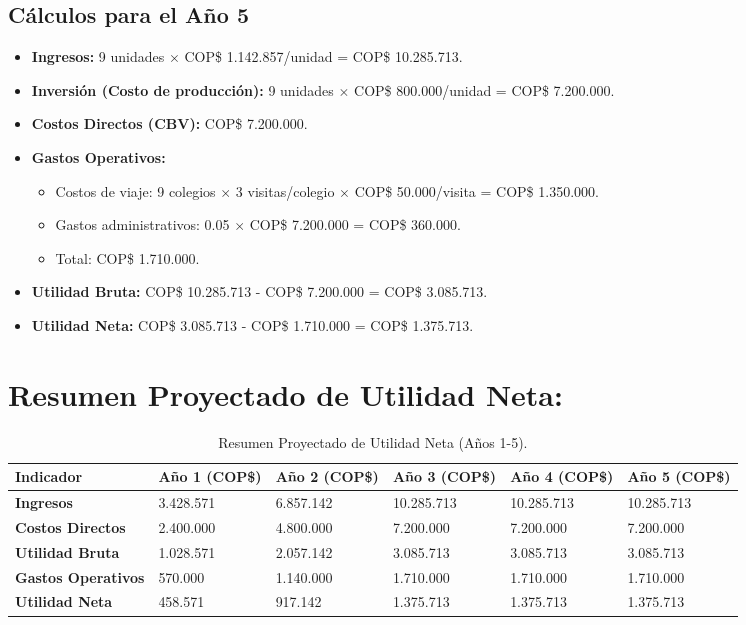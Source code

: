 \subsection*{Cálculos para el Año 5}
\begin{itemize}
    \item \textbf{Ingresos:} 
			9 unidades $\times$ COP\$ 1.142.857/unidad = COP\$ 10.285.713.
    \item \textbf{Inversión (Costo de producción):} 
			9 unidades $\times$ COP\$ 800.000/unidad = COP\$ 7.200.000.
    \item \textbf{Costos Directos (CBV):} COP\$ 7.200.000.
    \item \textbf{Gastos Operativos:}
    \begin{itemize}
        \item Costos de viaje: 
					9 colegios $\times$ 3 visitas/colegio $\times$ COP\$ 50.000/visita = 
					COP\$ 1.350.000.
        \item Gastos administrativos: 0.05 $\times$ COP\$ 7.200.000 = 
					COP\$ 360.000.
        \item Total: COP\$ 1.710.000.
    \end{itemize}
    \item \textbf{Utilidad Bruta:} COP\$ 10.285.713 - COP\$ 7.200.000 = COP\$ 3.085.713.
    \item \textbf{Utilidad Neta:} COP\$ 3.085.713 - COP\$ 1.710.000 = COP\$ 1.375.713.
\end{itemize}

\newpage

\section*{Resumen Proyectado de Utilidad Neta:}

\begin{table}[h!]
    \centering
    \small 
    \begin{tabularx}{\textwidth}{lXXXXX} 
        \toprule
        \textbf{Indicador} & \textbf{Año 1 (COP\$)} & \textbf{Año 2 (COP\$)} & \textbf{Año 3 (COP\$)} & \textbf{Año 4 (COP\$)} & \textbf{Año 5 (COP\$)} \\
        \midrule
        \textbf{Ingresos} &  3.428.571 & 6.857.142 & 10.285.713 & 10.285.713 & 10.285.713 \\
        \textbf{Costos Directos} & 2.400.000 & 4.800.000 & 7.200.000 & 7.200.000 & 7.200.000 \\
        \textbf{Utilidad Bruta} & 1.028.571 & 2.057.142 & 3.085.713 & 3.085.713 & 3.085.713 \\
        \textbf{Gastos Operativos} & 570.000 & 1.140.000 & 1.710.000 & 1.710.000 & 1.710.000 \\
        \textbf{Utilidad Neta} & 458.571 & 917.142 & 1.375.713 & 1.375.713 & 1.375.713 \\
        \bottomrule
    \end{tabularx}
    \caption{Resumen Proyectado de Utilidad Neta (Años 1-5).}
\end{table}

